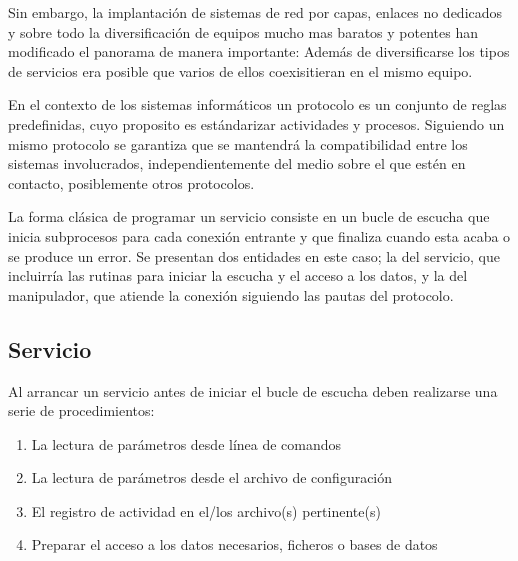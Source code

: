 \documentclass[a4paper,spanish,12pt]{book}
\begin{document}
Sin embargo, la implantación de sistemas de red por capas, enlaces no dedicados y sobre todo la diversificación de equipos mucho mas baratos y potentes han modificado el panorama de manera importante: Además de diversificarse los tipos de servicios era posible que varios de ellos coexisitieran en el mismo equipo.

En el contexto de los sistemas informáticos un protocolo es un conjunto de reglas predefinidas, cuyo proposito es estándarizar actividades y procesos. Siguiendo un mismo protocolo se garantiza que se mantendrá la compatibilidad entre los sistemas involucrados, independientemente del medio sobre el que est\'en en contacto, posiblemente otros protocolos.

La forma cl\'asica de programar un servicio consiste en un bucle de escucha que inicia subprocesos para cada conexi\'on entrante y que finaliza cuando esta acaba o se produce un error. Se presentan dos entidades en este caso; la del servicio, que incluirría las rutinas para iniciar la escucha y el acceso a los datos, y la del manipulador, que atiende la conexión siguiendo las pautas del protocolo.

\subsection{Servicio}

Al arrancar un servicio antes de iniciar el bucle de escucha deben realizarse una serie de procedimientos:
\begin{enumerate}
	\item La lectura de parámetros desde línea de comandos
	\item La lectura de parámetros desde el archivo de configuración
	\item El registro de actividad en el/los archivo(s) pertinente(s)
	\item Preparar el acceso a los datos necesarios, ficheros o bases de datos
\end{enumerate}
\end{document}
